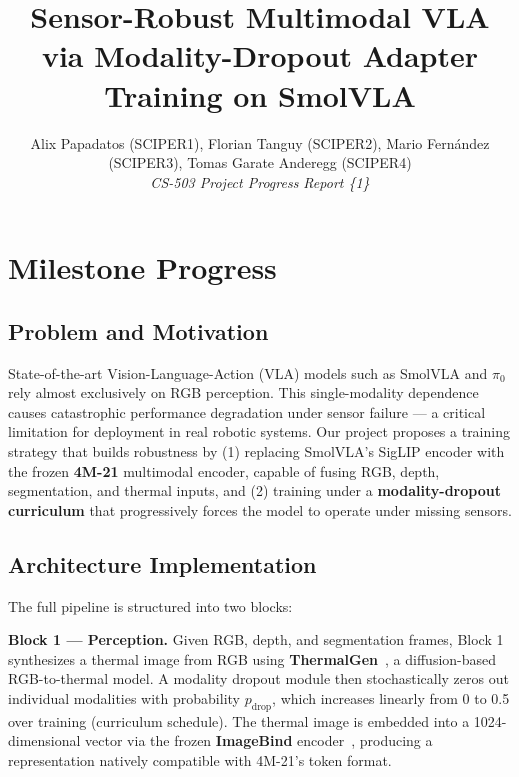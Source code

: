 \documentclass[10pt,conference,compsocconf]{IEEEtran}
\begin{document}
\title{Sensor-Robust Multimodal VLA via Modality-Dropout Adapter Training on SmolVLA}

\author{
  Alix Papadatos (SCIPER1), Florian Tanguy (SCIPER2), Mario Fern\'andez (SCIPER3), Tomas Garate Anderegg (SCIPER4)\\
  \textit{CS-503 Project Progress Report \{1\}}
}

\maketitle


\section{Milestone Progress}

\subsection{Problem and Motivation}

State-of-the-art Vision-Language-Action (VLA) models such as SmolVLA and $\pi_0$ rely almost exclusively on RGB perception. This single-modality dependence causes catastrophic performance degradation under sensor failure — a critical limitation for deployment in real robotic systems. Our project proposes a training strategy that builds robustness by (1) replacing SmolVLA's SigLIP encoder with the frozen \textbf{4M-21} multimodal encoder, capable of fusing RGB, depth, segmentation, and thermal inputs, and (2) training under a \textbf{modality-dropout curriculum} that progressively forces the model to operate under missing sensors.

\subsection{Architecture Implementation}

The full pipeline is structured into two blocks:

\textbf{Block 1 — Perception.} Given RGB, depth, and segmentation frames, Block 1 synthesizes a thermal image from RGB using \textbf{ThermalGen}~\cite{xiao2025thermalgen}, a diffusion-based RGB-to-thermal model. A modality dropout module then stochastically zeros out individual modalities with probability $p_{\text{drop}}$, which increases linearly from 0 to 0.5 over training (curriculum schedule). The thermal image is embedded into a 1024-dimensional vector via the frozen \textbf{ImageBind} encoder~\cite{girdhar2023imagebind}, producing a representation natively compatible with 4M-21's token format.
\end{document}
